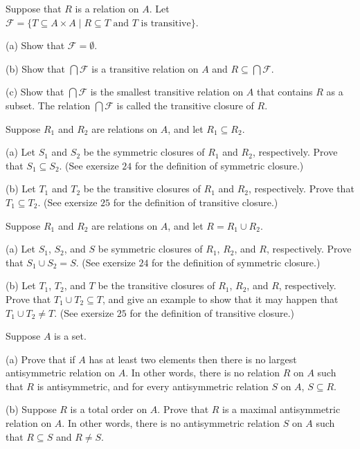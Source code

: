 \begin{tcolorbox}[title=Problem 25, breakable]
    Suppose that $R$ is a relation on $A$. Let $\mathcal{F} = \{T \subseteq A \times A \mid R \subseteq T
    \text{ and } T \text{ is transitive}\}$.

    (a) Show that $\mathcal{F} = \emptyset$.

    (b) Show that $\bigcap \mathcal{F}$ is a transitive relation on $A$ and $R \subseteq \bigcap \mathcal{F}$.
    
    (c) Show that $\bigcap \mathcal{F}$ is the smallest transitive relation on $A$ that contains $R$ 
        as a subset. The relation $\bigcap \mathcal{F}$ is called the transitive closure of $R$.
\end{tcolorbox}

\begin{tcolorbox}[title=Problem 26, breakable]
    Suppose $R_1$ and $R_2$ are relations on $A$, and let $R_1 \subseteq R_2$.

    (a) Let $S_1$ and $S_2$ be the symmetric closures of $R_1$ and $R_2$,
        respectively. Prove that $S_1 \subseteq S_2$. (See exersize $24$ for the 
        definition of symmetric closure.)

    (b) Let $T_1$ and $T_2$ be the transitive closures of $R_1$ and $R_2$, respectively.
        Prove that $T_1 \subseteq T_2$. (See exersize $25$ for the definition of transitive
        closure.)
\end{tcolorbox}

\begin{tcolorbox}[title=Problem 27, breakable]
    Suppose $R_1$ and $R_2$ are relations on $A$, and let $R = R_1 \cup R_2$.

    (a) Let $S_1$, $S_2$, and $S$ be symmetric closures of $R_1$, $R_2$, and $R$,
        respectively. Prove that $S_1 \cup S_2 = S$. (See exersize $24$ for the definition
        of symmetric closure.)

    (b) Let $T_1$, $T_2$, and $T$ be the transitive closures of $R_1$, $R_2$, and $R$,
        respectively. Prove that $T_1 \cup T_2 \subseteq T$, and give an example to 
        show that it may happen that $T_1 \cup T_2 \not= T$. (See exersize $25$ for 
        the definition of transitive closure.)
\end{tcolorbox}

\begin{tcolorbox}[title=Problem 28, breakable]
    Suppose $A$ is a set.

    (a) Prove that if $A$ has at least two elements then there is no largest antisymmetric
        relation on $A$. In other words, there is no relation $R$ on $A$ such that 
        $R$ is antisymmetric, and for every antisymmetric relation $S$ on $A$, $S \subseteq R$.

    (b) Suppose $R$ is a total order on $A$. Prove that $R$ is a maximal antisymmetric relation 
        on $A$. In other words, there is no antisymmetric relation $S$ on $A$ such that $R \subseteq S$
        and $R \not= S$.
\end{tcolorbox}


